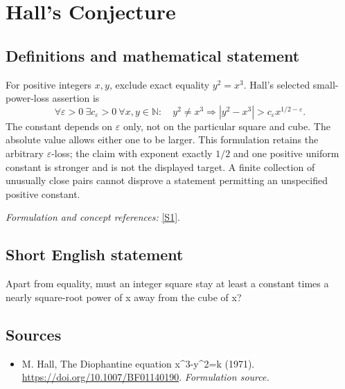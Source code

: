 \documentclass[11pt]{article}
\begin{document}
\section*{\texorpdfstring{Hall's Conjecture}{Hall's Conjecture}}\label{1241}
\subsection{Definitions and mathematical statement}
For positive integers $x,y$, exclude exact equality $y^2=x^3$. Hall's selected small-power-loss assertion is
\[
 \forall{\varepsilon}>0\ \exists c_{\varepsilon}>0\ \forall x,y\in{\mathbb{N}}:\quad
 y^2\ne x^3\Longrightarrow
 |y^2-x^3|>c_{\varepsilon} x^{1/2-{\varepsilon}}.
\]
The constant depends on ${\varepsilon}$ only, not on the particular square and cube. The absolute value allows either one to be larger. This formulation retains the arbitrary ${\varepsilon}$-loss; the claim with exponent exactly $1/2$ and one positive uniform constant is stronger and is not the displayed target. A finite collection of unusually close pairs cannot disprove a statement permitting an unspecified positive constant.
\par\smallskip\textit{Formulation and concept references:} \href{https://doi.org/10.1007/BF01140190}{[S1]}.

\subsection{Short English statement}
Apart from equality, must an integer square stay at least a constant times a nearly square-root power of x away from the cube of x?
\subsection{Sources}
\begin{itemize}
\item[S1]M. Hall, The Diophantine equation x\textasciicircum{}3-y\textasciicircum{}2=k (1971).
\url{https://doi.org/10.1007/BF01140190}.
\textit{Formulation source.}
\end{itemize}
\end{document}
